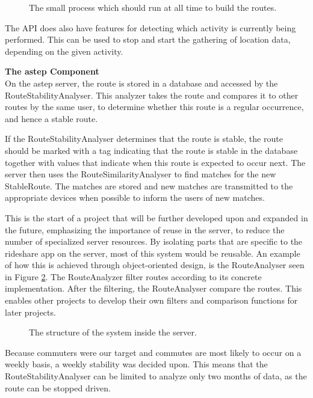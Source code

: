 \begin{figure}[h]
	\centering
	
	\caption{The small process which should run at all time to build the routes.}
	\label{fig:classDiagramSprint1Observer}
\end{figure}

The API does also have features for detecting which activity is currently being performed.
This can be used to stop and start the gathering of location data, depending on the given activity.

\textbf{The \gls{astep} Component}\\
On the \gls{astep} server, the route is stored in a database and accessed by the RouteStabilityAnalyser.
This analyzer takes the route and compares it to other routes by the same user, to determine whether this route is a regular occurrence, and hence a stable route.

If the RouteStabilityAnalyser determines that the route is stable, the route should be marked with a tag indicating that the route is stable in the database together with values that indicate when this route is expected to occur next.
The server then uses the RouteSimilarityAnalyser to find matches for the new StableRoute.
The matches are stored and new matches are transmitted to the appropriate devices when possible to inform the users of new matches.

%	

This is the start of a project that will be further developed upon and expanded in the future, emphasizing the importance of reuse in the server, to reduce the number of specialized server resources.
By isolating parts that are specific to the rideshare app on the server, most of this system would be reusable.
An example of how this is achieved through object-oriented design, is the RouteAnalyser seen in Figure \ref{fig:classDiagramSprint1Server}.
The RouteAnalyzer filter routes according to its concrete implementation.
After the filtering, the RouteAnalyser compare the routes.
This enables other projects to develop their own filters and comparison functions for later projects.

\begin{figure}[h!]
	\centering
	
	\caption{The structure of the system inside the server.}
	\label{fig:classDiagramSprint1Server}
\end{figure}

Because commuters were our target and commutes are most likely to occur on a weekly basis, a weekly stability was decided upon.
This means that the RouteStabilityAnalyser can be limited to analyze only two months of data, as the route can be stopped driven.
